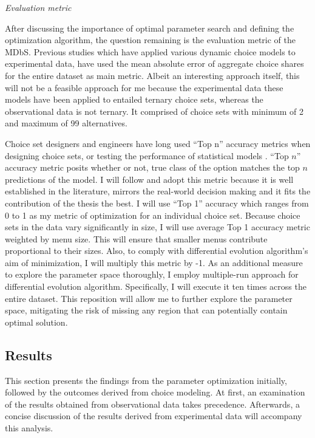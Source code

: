 \documentclass[a4paper,12pt]{article}
\begin{document}
\textit{Evaluation metric}

After discussing the importance of optimal parameter search and defining the optimization algorithm, the question remaining is the evaluation metric of the MDbS. Previous studies which have applied various dynamic choice models to experimental data, have used the mean absolute error of aggregate choice shares for the entire dataset as main metric. Albeit an interesting approach itself, this will not be a feasible approach for me because the experimental data these models have been applied to entailed ternary choice sets, whereas the observational data is not ternary. It comprised of choice sets with minimum of 2 and maximum of 99 alternatives. 

Choice set designers and engineers have long used ``Top n'' accuracy metrics when designing choice sets, or testing the performance of statistical models \citep{ricci2015recommender}. ``Top $n$'' accuracy metric posits whether or not, true class of the option matches the top $n$ predictions of the model. I will follow and adopt this metric because it is well established in the literature, mirrors the real-world decision making and it fits the contribution of the thesis the best. I will use ``Top 1'' accuracy which ranges from 0 to 1 as my metric of optimization for an individual choice set. Because choice sets in the data vary significantly in size, I will use average Top 1 accuracy metric weighted by menu size. This will ensure that smaller menus contribute proportional to their sizes. Also, to comply with differential evolution algorithm's aim of minimization, I will multiply this metric by -1. As an additional measure to explore the parameter space thoroughly, I employ multiple-run approach for differential evolution algorithm. Specifically, I will execute it ten times across the entire dataset. This reposition will allow me to further explore the parameter space, mitigating the risk of missing any region that can potentially contain optimal solution.


\subsection{Results}

This section presents the findings from the parameter optimization initially, followed by the outcomes derived from choice modeling. At first, an examination of the results obtained from observational data takes precedence. Afterwards, a concise discussion of the results derived from experimental data will accompany this analysis.
\end{document}
